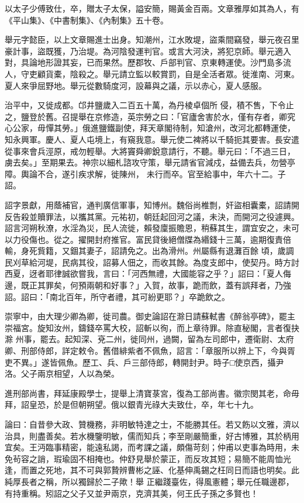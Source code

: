 \begin{pinyinscope}
 以太子少傅致仕，卒，贈太子太保，謚安簡，賜黃金百兩。文章雅厚如其為人，有《平山集》、《中書制集》、《內制集》五十卷。



 舉元字懿臣，以上文章賜進士出身。知潮州，江水敗堤，盜乘間竊發，舉元夜召里豪計事，盜既獲，乃治堤。為河陰發運判官。或言大河決，將犯京師。舉元適入對，具論地形證其妄，已而果然。歷郡牧、戶部判官、京東轉運使。沙門島多流人，守吏顧貨橐，陰殺之。舉元請立監以較賞罰，自是全活者眾。徙淮南、河東。夏人來爭屈野地。舉元從數騎度河，設幕與之議，示以赤心，夏人感服。



 治平中，又徙成都。邙井鹽歲入二百五十萬，為丹棱卓個所
 侵，積不售，下令止之，鹽登於舊。召提舉在京修造，英宗勞之曰：「官廬舍害於水，僅有存者，卿究心公家，毋憚其勞。」俄進鹽鐵副使，拜天章閣待制，知滄州，改河北都轉運使，知永興軍。慶人、夏人屯境上，有窺我意。舉元使二裨將以千騎扼其要害。長安遣從事來會兵涇原，戒勿輕舉。大將竇舜卿銳意請行，不聽。舉元曰：「不過三日，虜去矣。」至期果去。神宗以細札諮攻守策，舉元請省官減戍，益備去兵，勿營亭障。輿論不合，遂引疾求解，徙陳州，
 未行而卒。官至給事中，年六十二。子詔。



 詔字景獻，用蔭補官，通判廣信軍事，知博州。魏俗尚椎剽，奸盜相囊橐，詔請開反告殺並贖罪法，以攜其黨。元祐初，朝廷起回河之議，未決，而開河之役遽興。詔言河朔秋潦，水淫為災，民人流徙，賴發廩振贍恩，稍蘇其生，謂宜安之，未可以力役傷也。從之。擢開封府推官。富民貸後絕僧牒為緡錢十三萬，逾期復責倍輸，身死貲籍，又錮其妻子，詔請免之。出為滑州。州屬縣有退灘百餘
 頃，歲調民刈草給河堤，民病其役，詔募人佃之，而收其餘。為度支郎中，使契丹。時方討西夏，迓者耶律誠欲嘗我，言曰：「河西無禮，大國能容之乎？」詔曰：「夏人侮邊，既正其罪矣，何預兩朝和好事？」入賀，故事，跪而飲，蓋有誤拜者，乃強詔。詔曰：「南北百年，所守者禮，其可紛更耶？」卒跪飲之。



 崇寧中，由大理少卿為卿，徙司農。御史論詔在滁日請蘇軾書《醉翁亭碑》，罷主崇福宮。旋知汝州，鑄錢卒罵大校，詔斬以徇，而上章待罪。除直秘閣，言者復抉滁
 州事，罷去。起知深、兗二州，徙同州，過闕，留為左司郎中，遷衛尉、太府卿、刑部侍郎，詳定敕令。舊借緋紫者不佩魚，詔言：「章服所以辨上下，今與胥吏不異。」遂皆佩魚。歷工、兵、戶三部侍郎，轉開封尹。時子□使京西，攝尹洛。父子兩京相望，人以為榮。



 進刑部尚書，拜延康殿學士，提舉上清寶菉宮，復為工部尚書。徽宗閔其老，命毋拜，詔皇恐，於是但朝朔望。俄以銀青光祿大夫致仕，卒，年七十九。



 論曰：自昔參大政、贊機務，非明敏特達之士，不能勝其任。若又飭以文雅，濟以治具，則盡善矣。若水機鑒明敏，儒而知兵；李至剛嚴簡重，好古博雅，其於柄用宜矣。王沔臨事精密，能遠私謁，而考課之議，頗傷苛刻；仲甫以吏事為時用，未免茍容之誚，瑕瑜固不相掩也。仲舒見舉於蒙正，而反攻其短；易簡不能周恤光逢，而置之死地，其不可與郭贄辨曹彬之誣、化基伸禹錫之枉同日而語也明矣。此純厚長者之稱，所以獨歸於二子歟！舉
 正繼踐臺佐，得風憲體；舉元任職邊郡，有持重稱。矧詔之父子又並尹兩京，克濟其美，何王氏子孫之多賢也！



\end{pinyinscope}